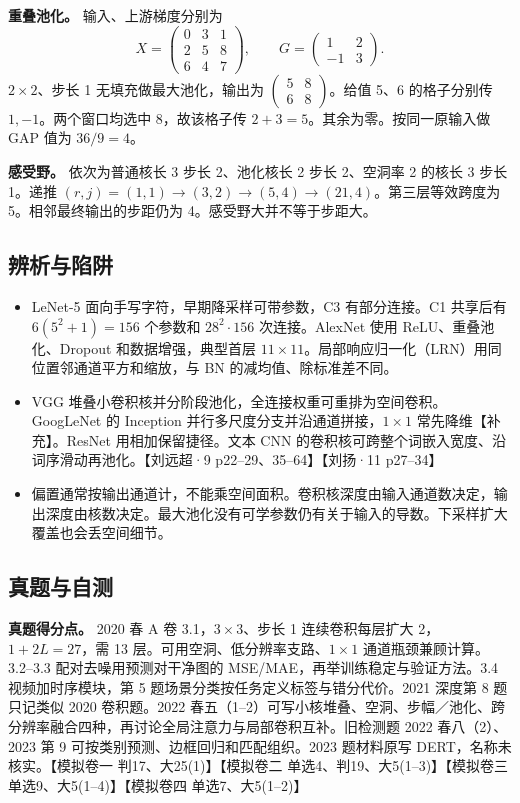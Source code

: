 \documentclass[UTF8,a4paper,zihao=-4,fontset=fandol]{ctexart}
\begin{document}
\textbf{重叠池化。} 输入、上游梯度分别为
\[
 X=\begin{pmatrix}0&3&1\\2&5&8\\6&4&7\end{pmatrix},\qquad
 G=\begin{pmatrix}1&2\\-1&3\end{pmatrix}.
\]
$2\times2$、步长 1 无填充做最大池化，输出为 $\begin{pmatrix}5&8\\6&8\end{pmatrix}$。给值 5、6 的格子分别传 $1,-1$。两个窗口均选中 8，故该格子传 $2+3=5$。其余为零。按同一原输入做 GAP 值为 $36/9=4$。

\textbf{感受野。} 依次为普通核长 3 步长 2、池化核长 2 步长 2、空洞率 2 的核长 3 步长 1。递推 $(r,j)=(1,1)\to(3,2)\to(5,4)\to(21,4)$。第三层等效跨度为 5。相邻最终输出的步距仍为 4。感受野大并不等于步距大。

\subsection{辨析与陷阱}

\begin{itemize}
\item LeNet-5 面向手写字符，早期降采样可带参数，C3 有部分连接。C1 共享后有 $6(5^2+1)=156$ 个参数和 $28^2\cdot156$ 次连接。AlexNet 使用 ReLU、重叠池化、Dropout 和数据增强，典型首层 $11\times11$。局部响应归一化（LRN）用同位置邻通道平方和缩放，与 BN 的减均值、除标准差不同。
\item VGG 堆叠小卷积核并分阶段池化，全连接权重可重排为空间卷积。GoogLeNet 的 Inception 并行多尺度分支并沿通道拼接，$1\times1$ 常先降维【补充】。ResNet 用相加保留捷径。文本 CNN 的卷积核可跨整个词嵌入宽度、沿词序滑动再池化。【刘远超·9 p22--29、35--64】【刘扬·11 p27--34】
\item 偏置通常按输出通道计，不能乘空间面积。卷积核深度由输入通道数决定，输出深度由核数决定。最大池化没有可学参数仍有关于输入的导数。下采样扩大覆盖也会丢空间细节。
\end{itemize}

\subsection{真题与自测}

\textbf{真题得分点。} 2020 春 A 卷 3.1，$3\times3$、步长 1 连续卷积每层扩大 2，$1+2L=27$，需 13 层。可用空洞、低分辨率支路、$1\times1$ 通道瓶颈兼顾计算。3.2--3.3 配对去噪用预测对干净图的 MSE/MAE，再举训练稳定与验证方法。3.4 视频加时序模块，第 5 题场景分类按任务定义标签与错分代价。2021 深度第 8 题只记类似 2020 卷积题。2022 春五（1--2）可写小核堆叠、空洞、步幅／池化、跨分辨率融合四种，再讨论全局注意力与局部卷积互补。旧检测题 2022 春八（2）、2023 第 9 可按类别预测、边框回归和匹配组织。2023 题材料原写 DERT，名称未核实。【模拟卷一 判17、大25(1)】【模拟卷二 单选4、判19、大5(1--3)】【模拟卷三 单选9、大5(1--4)】【模拟卷四 单选7、大5(1--2)】
\end{document}
